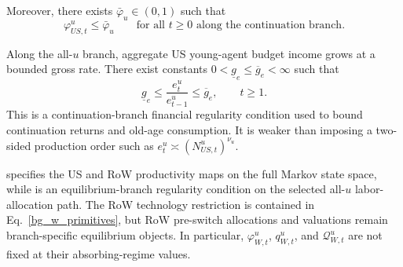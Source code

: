\documentclass{article}
\begin{document}
\begin{ass}\label{ass_us_u_allocation_upper_regular}
Moreover, there exists $\bar\varphi_u\in(0,1)$ such that
\begin{equation}\label{phi_u_upper_bound}
\varphi_{US,t}^u\le \bar\varphi_u
\qquad\text{for all }t\ge 0
\text{ along the continuation branch.}
\end{equation}
\end{ass}


\begin{ass}\label{ass_us_income_growth_regular}
Along the all-$u$ branch, aggregate US young-agent budget income grows at a bounded gross rate. There exist constants $0<\underline g_e\le \overline g_e<\infty$ such that
\[
\underline g_e
\le
\frac{e_t^u}{e_{t-1}^u}
\le
\overline g_e,
\qquad t\ge1.
\]
This is a continuation-branch financial regularity condition used to bound continuation returns and old-age consumption. It is weaker than imposing a two-sided production order such as $e_t^u\asymp (N_{US,t}^u)^{\nu_u}$.
\end{ass}

 specifies the US and RoW productivity maps on the full Markov state space, while  is an equilibrium-branch regularity condition on the selected all-$u$ labor-allocation path. The RoW technology restriction is contained in Eq.~\eqref{bg_w_primitives}, but RoW pre-switch allocations and valuations remain branch-specific equilibrium objects. In particular, $\varphi_{W,t}^u$, $q_{W,t}^u$, and $\mathcal Q_{W,t}^u$ are not fixed at their absorbing-regime values.
\end{document}

